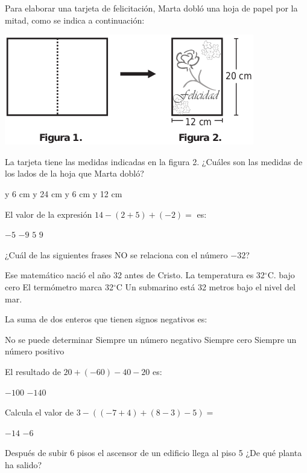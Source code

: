 \documentclass[10pt,letterpaper,addpoints]{exam}
\begin{document}
\begin{multicols}{2}
\begin{questions}
\begin{oneparchoices}
\end{oneparchoices}
\question Para elaborar una tarjeta de felicitación, Marta dobló una hoja de papel por la mitad, como se indica a continuación:
\begin{center}
\includegraphics[scale=.45]{Images/Pantallazo-19.png} 
\end{center}
La tarjeta tiene las medidas indicadas en la figura 2.
¿Cuáles son las medidas de los lados de la hoja que Marta dobló?
\begin{choices}
 y 6 cm
 y 24 cm
 y 6 cm
 y 12 cm
\end{choices}
\question El valor de la expresión 
$14-(2+5)+(-2)=$ es:
\begin{oneparchoices}
\choice $-5$
\choice $-9$
\CorrectChoice $5$
\choice $9$
\end{oneparchoices}
\question ¿Cuál de las siguientes frases NO se relaciona con el número $-32$?
\begin{choices}
\choice Ese matemático nació el año 32 antes de Cristo.
\choice La temperatura es 32$^{\circ}$C. bajo cero
\CorrectChoice El termómetro marca 32$^{\circ}$C
\choice Un submarino está 32 metros bajo el nivel del mar.
\end{choices}
\question La suma de dos enteros que tienen signos negativos es:
\begin{choices}
\choice No se puede determinar
\CorrectChoice Siempre un número negativo
\choice Siempre cero
\choice Siempre un número positivo
\end{choices}
\question  El resultado de $20+(-60)-40- 20$ es:

\begin{oneparchoices}
\CorrectChoice $-100$
\choice $-140$
\end{oneparchoices}
\question Calcula el valor de $3 - ((-7 + 4) + (8 - 3) - 5) =$

\begin{oneparchoices}
\choice $-14$
\choice $-6$
\end{oneparchoices}
\question Después de subir 6 pisos el ascensor de un edificio llega al piso 5 ¿De qué planta ha salido?


\end{questions}
\end{multicols}
\end{document}
